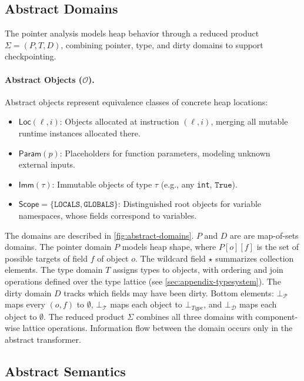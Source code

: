 \subsection{Abstract Domains}

The pointer analysis models heap behavior through a reduced product $\Sigma = (P, T, D)$, combining pointer, type, and dirty domains to support checkpointing.

\paragraph{Abstract Objects ($\mathcal{O}$).}
Abstract objects represent equivalence classes of concrete heap locations:
\begin{itemize}
    \item $\mathsf{Loc}(\ell,i)$: Objects allocated at instruction $(\ell,i)$, merging all mutable runtime instances allocated there.
    \item $\mathsf{Param}(p)$: Placeholders for function parameters, modeling unknown external inputs.
    \item $\mathsf{Imm}(\tau)$: Immutable objects of type $\tau$ (e.g., any \texttt{int}, $\mathtt{True}$).
    \item $\mathsf{Scope} = \{\mathtt{LOCALS}, \mathtt{GLOBALS}\}$: Distinguished root objects for variable namespaces, whose fields correspond to variables.
\end{itemize}

The domains are described in \autoref{fig:abstract-domains}. $P$ and $D$ are are map-of-sets domains. The pointer domain $P$ models heap shape, where $P[o][f]$ is the set of possible targets of field $f$ of object $o$. The wildcard field $\star$ summarizes collection elements. The type domain $T$ assigns types to objects, with ordering and join operations defined over the type lattice (see \autoref{sec:appendix-typesystem}). The dirty domain $D$ tracks which fields may have been dirty. Bottom elements: $\bot_\mathcal{P}$ maps every $(o,f)$ to $\emptyset$, $\bot_{\mathcal{T}}$ maps each object to $\bot_{\mathit{Type}}$, and $\bot_\mathcal{D}$ maps each object to $\emptyset$. The reduced product $\Sigma$ combines all three domains with component-wise lattice operations. Information flow between the domain occurs only in the abstract transformer.

\subsection{Abstract Semantics}

